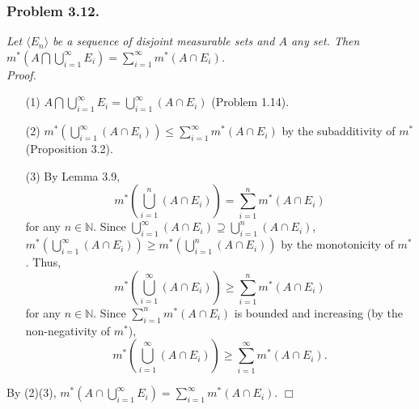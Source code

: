 \documentclass{article}
\begin{document}



\subsubsection*{Problem 3.12.}
\emph{Let $\langle E_n \rangle$ be a sequence of disjoint measurable sets and $A$ any set.
Then
$m^{*}\left( A \bigcap \bigcup_{i=1}^{\infty}E_i \right)
= \sum_{i=1}^{\infty} m^{*}(A \cap E_i)$.} \\



\emph{Proof.}
\begin{enumerate}
\item[(1)]
  $A \bigcap \bigcup_{i=1}^{\infty}E_i
  = \bigcup_{i=1}^{\infty}(A \cap E_i)$ (Problem 1.14).

\item[(2)]
  $m^{*}\left( \bigcup_{i=1}^{\infty}(A \cap E_i) \right)
  \leq \sum_{i=1}^{\infty} m^{*}(A \cap E_i)$
  by the subadditivity of $m^{*}$ (Proposition 3.2).

\item[(3)]
  By Lemma 3.9,
  $$m^{*}\left( \bigcup_{i=1}^{n}(A \cap E_i) \right)
  = \sum_{i=1}^{n} m^{*}(A \cap E_i)$$
  for any $n \in \mathbb{N}$.
  Since
  $\bigcup_{i=1}^{\infty}(A \cap E_i) \supseteq \bigcup_{i=1}^{n}(A \cap E_i)$,
  $m^{*}\left( \bigcup_{i=1}^{\infty}(A \cap E_i) \right)
  \geq m^{*}\left( \bigcup_{i=1}^{n}(A \cap E_i) \right)$ by the monotonicity of $m^{*}$.
  Thus,
  \[
    m^{*}\left( \bigcup_{i=1}^{\infty}(A \cap E_i) \right)
    \geq
    \sum_{i=1}^{n} m^{*}(A \cap E_i)
  \]
  for any $n \in \mathbb{N}$.
  Since $\sum_{i=1}^{n} m^{*}(A \cap E_i)$ is bounded and increasing
  (by the non-negativity of $m^{*}$),
  \[
    m^{*}\left( \bigcup_{i=1}^{\infty}(A \cap E_i) \right)
    \geq
    \sum_{i=1}^{\infty} m^{*}(A \cap E_i).
  \]
\end{enumerate}
By (2)(3),
$m^{*}\left( A \cap \bigcup_{i=1}^{\infty}E_i \right)
= \sum_{i=1}^{\infty} m^{*}(A \cap E_i)$.
$\Box$ \\\\



\end{document}
